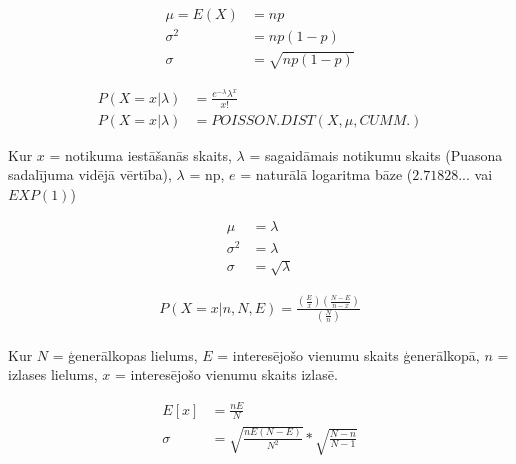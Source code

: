 {\begin{align*}
    \mu = E(X) &= np \\
    \sigma^2 &= np(1-p) \\
    \sigma &= \sqrt{np(1-p)}
\end{align*}}


{\begin{align*}
    P(X=x|\lambda) &= \displaystyle\frac{e^{-\lambda}\lambda^x}{x!} \\
    P(X=x|\lambda) &= POISSON.DIST(X, \mu, CUMM.) 
\end{align*}

Kur $x$ = notikuma iestāšanās skaits, $\lambda$ = sagaidāmais notikumu skaits
(Puasona sadalījuma vidējā vērtība), $\lambda$ = np, $e$ = naturālā logaritma
bāze ($2.71828...$ vai $EXP(1)$)
}
{\begin{align*}
    \mu &= \lambda \\
    \sigma^2 &= \lambda \\
    \sigma &= \sqrt{\lambda}
\end{align*}
}

{\begin{align*}
    P(X=x|n,N,E)=\displaystyle\frac{(\frac{E}{x})(\frac{N-E}{n-x})}{(\frac{N}{n})} \\
\end{align*}

    Kur $N$ = ģenerālkopas lielums, $E$ = interesējošo vienumu skaits
    ģenerālkopā, $n$ = izlases lielums, $x$ = interesējošo vienumu skaits
    izlasē.
}


{\begin{align*}
    E[x]&=\displaystyle\frac{nE}{N} \\
    \sigma &= \sqrt{\displaystyle\frac{nE(N-E)}{N^2}}*\sqrt{\displaystyle\frac{N-n}{N-1}}
\end{align*}}
